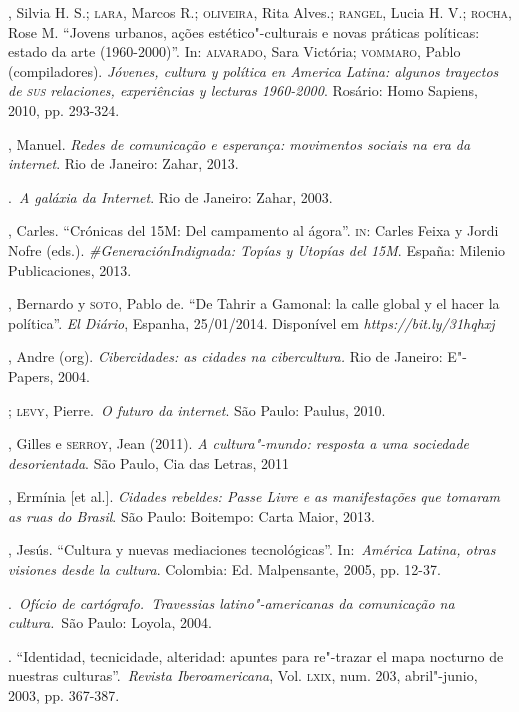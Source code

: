\begin{bibliohedra}
, Silvia H. S.; \textsc{lara}, Marcos R.; \textsc{oliveira}, Rita Alves.; \textsc{rangel},
Lucia H. V.; \textsc{rocha}, Rose M. ``Jovens urbanos, ações estético"-culturais e
novas práticas políticas: estado da arte (1960-2000)''. In: \textsc{alvarado},
Sara Victória; \textsc{vommaro}, Pablo (compiladores). \emph{Jóvenes, cultura y
política en America Latina: algunos trayectos de \textsc{sus} relaciones,
experiências y lecturas 1960-2000}. Rosário: Homo Sapiens, 2010, pp.
293-324.

, Manuel. \emph{Redes de comunicação e esperança: movimentos
sociais na era da internet}. Rio de Janeiro: Zahar, 2013.

\titidem.~\emph{A galáxia da Internet}. Rio de
Janeiro: Zahar, 2003.

, Carles. ``Crónicas del 15M: Del campamento al ágora''. \textsc{in}: Carles
Feixa y Jordi Nofre (eds.). \emph{\#GeneraciónIndignada: Topías y
Utopías del 15M}. España: Milenio Publicaciones, 2013.

, Bernardo y \textsc{soto}, Pablo de. ``De Tahrir a Gamonal: la calle
global y el hacer la política''. \emph{El Diário}, Espanha, 25/01/2014.
Disponível em
\emph{https://bit.ly/31hqhxj}

, Andre (org). \emph{Cibercidades: as cidades na cibercultura.} Rio
de Janeiro: E"-Papers, 2004.

\titidem; \textsc{levy}, Pierre.~\emph{O futuro da internet}. São Paulo:
Paulus, 2010.

, Gilles e \textsc{serroy}, Jean (2011). \emph{A cultura"-mundo:
resposta a uma sociedade desorientada}. São Paulo, Cia das Letras, 2011

, Ermínia {[}et al.{]}. \emph{Cidades rebeldes: Passe Livre e as
manifestações que tomaram as ruas do Brasil}. São Paulo: Boitempo: Carta
Maior, 2013.

, Jesús. ``Cultura y nuevas mediaciones tecnológicas''.
In:~\emph{América Latina, otras visiones desde la cultura}. Colombia:
Ed. Malpensante, 2005, pp. 12-37.

\titidem.~\emph{Ofício de
cartógrafo.~Travessias latino"-americanas da comunicação na cultura.}~São
Paulo: Loyola, 2004.

\titidem. ``Identidad, tecnicidade,
alteridad: apuntes para re"-trazar el mapa nocturno de nuestras
culturas''.~\emph{Revista Iberoamericana}, Vol. \textsc{lxix}, num. 203,
abril"-junio, 2003, pp. 367-387.


\end{bibliohedra}
